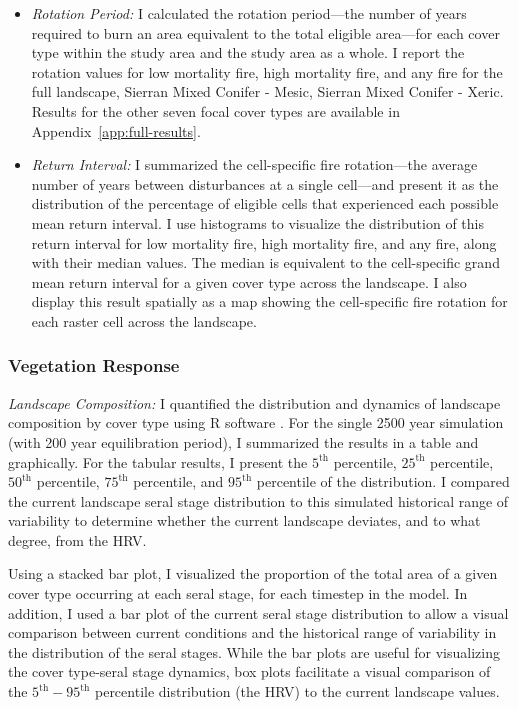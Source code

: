 \begin{itemize}
	\item \emph{Rotation Period:} I calculated the rotation period---the number of years required to burn an area equivalent to the total eligible area---for each cover type within the study area and the study area as a whole. I report the rotation values for low mortality fire, high mortality fire, and any fire for the full landscape, Sierran Mixed Conifer - Mesic, Sierran Mixed Conifer - Xeric. Results for the other seven focal cover types are available in Appendix~\ref{app:full-results}.
	\item \emph{Return Interval:} I summarized the cell-specific fire rotation---the average number of years between disturbances at a single cell---and present it as the distribution of the percentage of eligible cells that experienced each possible mean return interval. I use histograms to visualize the distribution of this return interval for low mortality fire, high mortality fire, and any fire, along with their median values. The median is equivalent to the cell-specific grand mean return interval for a given cover type across the landscape. I also display this result spatially as a map showing the cell-specific fire rotation for each raster cell across the landscape. 
\end{itemize}

\subsubsection*{Vegetation Response} 

\emph{Landscape Composition:} I quantified the distribution and dynamics of landscape composition by cover type using R software \citep{RCoreTeam2013}. For the single 2500 year simulation (with 200 year equilibration period), I summarized the results in a table and graphically. For the tabular results, I present the $5^{\text{th}}$ percentile, $25^{\text{th}}$ percentile, $50^{\text{th}}$ percentile, $75^{\text{th}}$ percentile, and $95^{\text{th}}$ percentile of the distribution. I compared the current landscape seral stage distribution to this simulated historical range of variability to determine whether the current landscape deviates, and to what degree, from the HRV. 

Using a stacked bar plot, I visualized the proportion of the total area of a given cover type occurring at each seral stage, for each timestep in the model. In addition, I used a bar plot of the current seral stage distribution to allow a visual comparison between current conditions and the historical range of variability in the distribution of the seral stages. While the bar plots are useful for visualizing the cover type-seral stage dynamics, box plots facilitate a visual comparison of the $5^{\text{th}}-95^{\text{th}}$ percentile distribution (the HRV) to the current landscape values.

